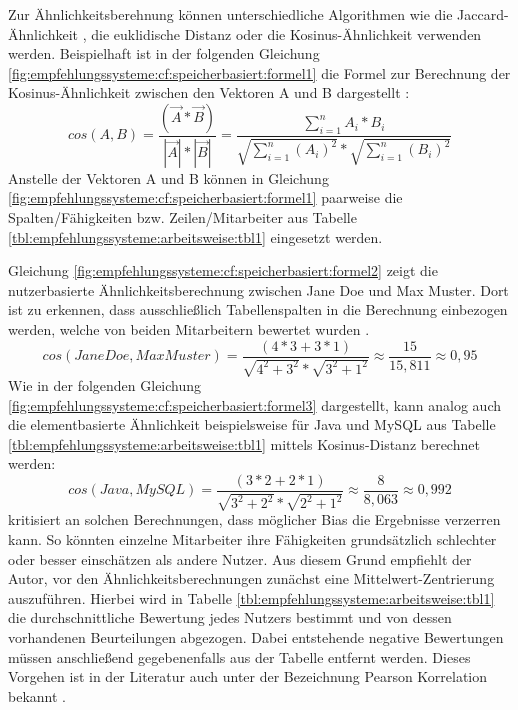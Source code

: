 Zur Ähnlichkeitsberehnung können unterschiedliche Algorithmen wie die Jaccard-Ähnlichkeit \cite[S. 2]{bharti:2019}, die euklidische Distanz \cite[S. 3]{cheng:2013} oder die Kosinus-Ähnlichkeit \cite[S. 2]{duong:2018} verwenden werden. Beispielhaft ist in der folgenden Gleichung \ref{fig:empfehlungssysteme:cf:speicherbasiert:formel1} die Formel zur Berechnung der Kosinus-Ähnlichkeit zwischen den Vektoren A und B dargestellt \cite[S. 111]{bharti:2019}:
\begin{equation}
cos(A,B) = \frac{(\vec{A} * \vec{B})}{|\vec{A}| * |\vec{B}|} = \frac{\sum_{i=1}^n A_i * B_i}{\sqrt{\sum_{i=1}^n (A_i)^2} * \sqrt{\sum_{i=1}^n (B_i)^2}}
\label{fig:empfehlungssysteme:cf:speicherbasiert:formel1}
\end{equation}
Anstelle der Vektoren A und B können in Gleichung \ref{fig:empfehlungssysteme:cf:speicherbasiert:formel1} paarweise die Spalten/Fähigkeiten bzw. Zeilen/Mitarbeiter aus Tabelle \ref{tbl:empfehlungssysteme:arbeitsweise:tbl1} eingesetzt werden.

Gleichung \ref{fig:empfehlungssysteme:cf:speicherbasiert:formel2} zeigt die nutzerbasierte Ähnlichkeitsberechnung zwischen Jane Doe und Max Muster. Dort ist zu erkennen, dass ausschließlich Tabellenspalten in die Berechnung einbezogen werden, welche von beiden Mitarbeitern bewertet wurden \cite[S. 2f.]{hao:2013}.
\begin{equation}
	cos(Jane Doe,Max Muster) = \frac{(4*3 + 3*1)}{\sqrt{4^2 + 3^2} * \sqrt{3^2 + 1^2}} \approx \frac{15}{15,811} \approx 0,95
	\label{fig:empfehlungssysteme:cf:speicherbasiert:formel2}
\end{equation}
Wie in der folgenden Gleichung \ref{fig:empfehlungssysteme:cf:speicherbasiert:formel3} dargestellt, kann analog auch die elementbasierte Ähnlichkeit beispielsweise für Java und MySQL aus Tabelle \ref{tbl:empfehlungssysteme:arbeitsweise:tbl1} mittels Kosinus-Distanz berechnet werden:
\begin{equation}
	cos(Java, MySQL) = \frac{(3*2 + 2*1)}{\sqrt{3^2 + 2^2} * \sqrt{2^2 + 1^2}} \approx \frac{8}{8,063} \approx 0,992
	\label{fig:empfehlungssysteme:cf:speicherbasiert:formel3}
\end{equation}
\textcite[S. 35ff.]{recommenderSystems:2016} kritisiert an solchen Berechnungen, dass möglicher Bias die Ergebnisse verzerren kann. So könnten einzelne Mitarbeiter ihre Fähigkeiten grundsätzlich schlechter oder besser einschätzen als andere Nutzer. Aus diesem Grund empfiehlt der Autor, vor den Ähnlichkeitsberechnungen zunächst eine Mittelwert-Zentrierung auszuführen. Hierbei wird in Tabelle \ref{tbl:empfehlungssysteme:arbeitsweise:tbl1} die durchschnittliche Bewertung jedes Nutzers bestimmt und von dessen vorhandenen Beurteilungen abgezogen. Dabei entstehende negative Bewertungen müssen anschließend gegebenenfalls aus der Tabelle entfernt werden. Dieses Vorgehen ist in der Literatur auch unter der Bezeichnung Pearson Korrelation bekannt \cite[S. 3]{bharti:2019}.

